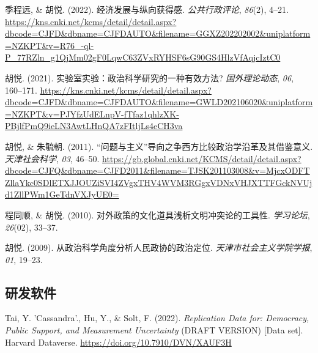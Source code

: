 \documentclass[11pt,a4paper,]{awesome-cv}
\begin{document}
\begingroup
\setlength{\parindent}{-0.5in}
\setlength{\leftskip}{0.5in}

\hypertarget{bibliography}{}
\leavevmode{}%
季程远, \& 胡悦. (2022). 经济发展与纵向获得感. \emph{公共行政评论},
\emph{86}(2), 4--21.
\url{https://kns.cnki.net/kcms/detail/detail.aspx?dbcode=CJFD\&dbname=CJFDAUTO\&filename=GGXZ202202002\&uniplatform=NZKPT\&v=R76_-ql-P_77RZln_g1QjMm02gF0LqwC63ZVxRYHSF6sG90GS4HlzVfAqjcIztC0}

\leavevmode{}%
胡悦. (2021). 实验室实验：政治科学研究的一种有效方法?
\emph{国外理论动态}, \emph{06}, 160--171.
\url{https://kns.cnki.net/kcms/detail/detail.aspx?dbcode=CJFD\&dbname=CJFDAUTO\&filename=GWLD202106020\&uniplatform=NZKPT\&v=PJYfzUdELnpV-fTfaz1qhlzXK-PBjlfPmQ9ieLN3AwtLHnQA7zFItljLs4eCH3va}

\leavevmode{}%
胡悦, \& 朱毓朝. (2011).
{``问题与主义''}导向之争西方比较政治学沿革及其借鉴意义.
\emph{天津社会科学}, \emph{03}, 46--50.
\url{https://gb.global.cnki.net/KCMS/detail/detail.aspx?dbcode=CJFQ\&dbname=CJFD2011\&filename=TJSK201103008\&v=MjcxODFTZllaYkc0SDlETXJJOUZiSVI4ZVgxTHV4WVM3RGgxVDNxVHJXTTFGckNVUjd1ZllPWm1GeTdnVXJyUE0=}

\leavevmode{}%
程同顺, \& 胡悦. (2010). 对外政策的文化道具浅析文明冲突论的工具性.
\emph{学习论坛}, \emph{26}(02), 33--37.

\leavevmode{}%
胡悦. (2009). 从政治科学角度分析人民政协的政治定位.
\emph{天津市社会主义学院学报}, \emph{01}, 19--23.

\endgroup

\hypertarget{ux7814ux53d1ux8f6fux4ef6}{%
\subsection{\texorpdfstring{\textbf{研发软件}}{研发软件}}\label{ux7814ux53d1ux8f6fux4ef6}}

\begingroup
\setlength{\parindent}{-0.5in}
\setlength{\leftskip}{0.5in}

\hypertarget{bibliography}{}
\leavevmode{}%
Tai, Y. 'Cassandra'., Hu, Y., \& Solt, F. (2022). \emph{Replication Data
for: Democracy, Public Support, and Measurement Uncertainty} (DRAFT
VERSION) {[}Data set{]}. Harvard Dataverse.
\url{https://doi.org/10.7910/DVN/XAUF3H}
\end{document}
